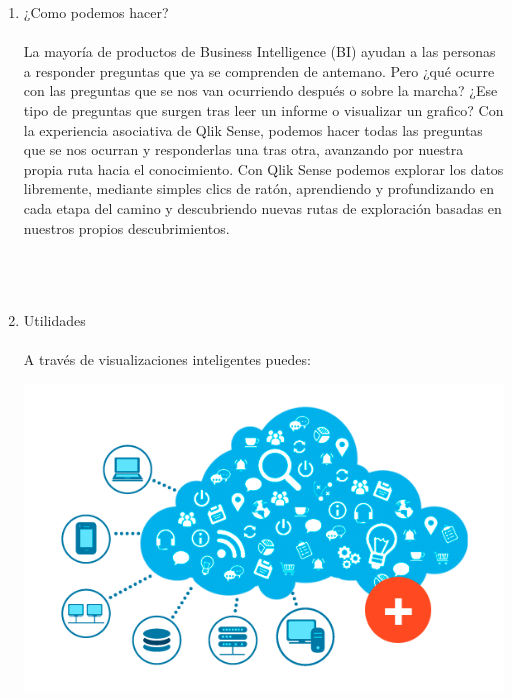 \begin{enumerate}[1.]
                   Qlik Sense es una aplicaci\'on de visualizaci\'on y descubrimiento de datos gobernada, basada en servidor, ideal para las necesidades anal\'iticas de grupos, departmentos o toda una organizaci\'on. Los usuarios de negocio obtienen un an\'alisis de datos potente, flexible y personalizado y colaboraci\'on en cualquier dispositivo, a la vez que se adhieren a unas pol\'iticas de gobierno y seguridad centralizada de datos.\\
                  \\  
              \item ¿Como podemos hacer?\\
               \\ 
               La mayor\'ia de productos de Business Intelligence (BI) ayudan a las personas a responder preguntas que ya se comprenden de antemano. Pero ¿qu\'e ocurre con las preguntas que se nos van ocurriendo despu\'es o sobre la marcha? ¿Ese tipo de preguntas que surgen tras leer un informe o visualizar un grafico? Con la experiencia asociativa de Qlik Sense, podemos hacer todas las preguntas que se nos ocurran y responderlas una tras otra, avanzando por nuestra propia ruta hacia el conocimiento. Con Qlik Sense podemos explorar los datos libremente, mediante simples clics de rat\'on, aprendiendo y profundizando en cada etapa del camino y descubriendo nuevas rutas de exploraci\'on basadas en nuestros propios descubrimientos.
              \\
              \\
               \\
               \\
              \item Utilidades \\
            \\
A trav\'es de visualizaciones inteligentes puedes: \\
             
                \begin{center}
                    \includegraphics[scale=0.60]{./Imagenes/caracteristicas.png}
                 \end{center}


\end{enumerate}
